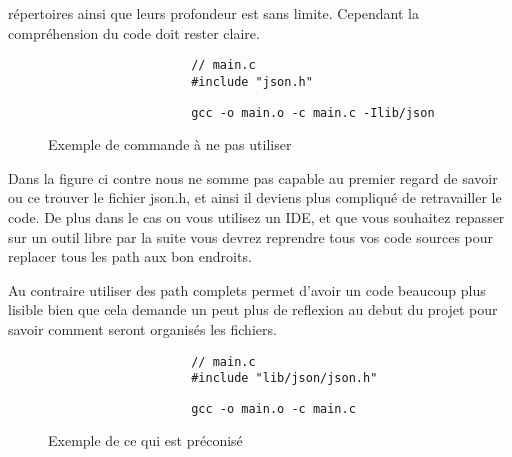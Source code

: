 			répertoires ainsi que leurs profondeur est sans limite. Cependant la compréhension du code doit rester claire.

			\begin{figure}[H]
				\begin{changemargin}{-2.5cm}{-2.5cm}
				\begin{tcolorbox}
				\begin{verbatim}
					// main.c
					#include "json.h"
				\end{verbatim}
				\end{tcolorbox}
				\end{changemargin}

				\begin{changemargin}{-2.5cm}{-2.5cm}
				\begin{tcolorbox}
				\begin{verbatim}
					gcc -o main.o -c main.c -Ilib/json
				\end{verbatim}
				\end{tcolorbox}
				\end{changemargin}
				\caption{Exemple de commande à ne pas utiliser}
			\end{figure}

			Dans la figure ci contre nous ne somme pas capable au premier regard de savoir ou ce trouver le fichier json.h, et ainsi il deviens plus compliqué de retravailler le code. De plus dans le cas ou vous utilisez un IDE, et que vous souhaitez repasser sur un outil libre par la suite vous devrez reprendre tous vos code sources pour replacer tous les path aux bon endroits.

			Au contraire utiliser des path complets permet d'avoir un code beaucoup plus lisible bien que cela demande un peut plus de reflexion au debut du projet pour savoir comment seront organisés les fichiers.

			\begin{figure}[H]
				\begin{changemargin}{-2.5cm}{-2.5cm}
				\begin{tcolorbox}
				\begin{verbatim}
					// main.c
					#include "lib/json/json.h"
				\end{verbatim}
				\end{tcolorbox}
				\end{changemargin}

				\begin{changemargin}{-2.5cm}{-2.5cm}
				\begin{tcolorbox}
				\begin{verbatim}
					gcc -o main.o -c main.c
				\end{verbatim}
				\end{tcolorbox}
				\end{changemargin}
				\caption{Exemple de ce qui est préconisé}
			\end{figure}

